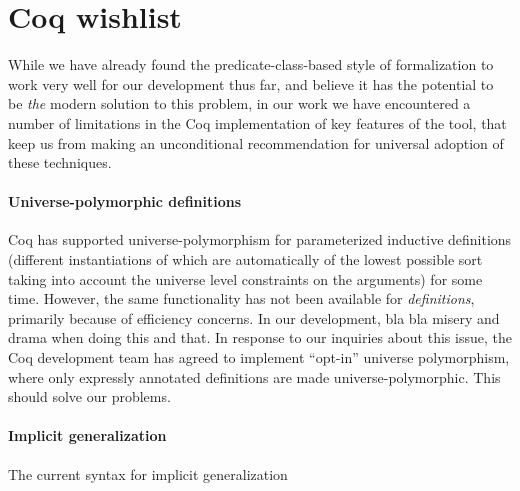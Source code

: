 \documentclass[a4paper,10pt,runningheads]{llncs}
\begin{document}

\section{Coq wishlist}

While we have already found the predicate-class-based style of formalization to work very well for our development thus far, and believe it has the potential to be \emph{the} modern solution to this problem, in our work we have encountered a number of limitations in the Coq implementation of key features of the tool, that keep us from making an unconditional recommendation for universal adoption of these techniques.

\paragraph{Universe-polymorphic definitions}
Coq has supported universe-polymorphism for parameterized inductive definitions (different instantiations of which are automatically of the lowest possible sort taking into account the universe level constraints on the arguments) for some time. However, the same functionality has not been available for \emph{definitions}, primarily because of efficiency concerns. In our development, bla bla misery and drama when doing this and that. In response to our inquiries about this issue, the Coq development team has agreed to implement ``opt-in'' universe polymorphism, where only expressly annotated definitions are made universe-polymorphic. This should solve our problems.

\paragraph{Implicit generalization}

The current syntax for implicit generalization 
\end{document}
